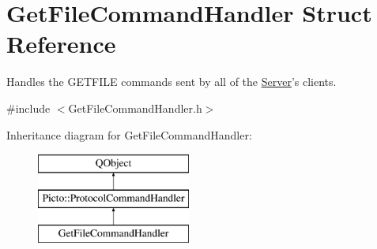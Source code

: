 \hypertarget{struct_get_file_command_handler}{\section{Get\-File\-Command\-Handler Struct Reference}
\label{struct_get_file_command_handler}
}


Handles the G\-E\-T\-F\-I\-L\-E commands sent by all of the \hyperlink{class_server}{Server}'s clients.  




{\ttfamily \#include $<$Get\-File\-Command\-Handler.\-h$>$}

Inheritance diagram for Get\-File\-Command\-Handler\-:\begin{figure}[H]
\begin{center}
\leavevmode
\includegraphics[height=3.000000cm]{struct_get_file_command_handler}
\end{center}
\end{figure}

